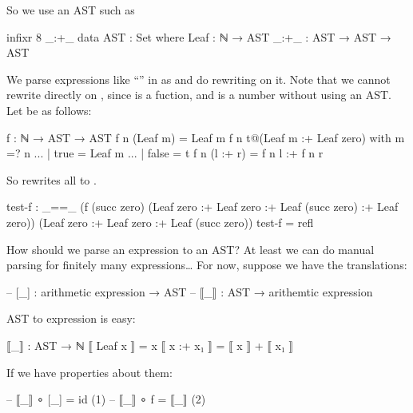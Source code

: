 \documentclass{article}
\begin{document}
So we use an AST such as

\begin{code}
infixr 8 _:+_
data AST : Set where
  Leaf : ℕ → AST
  _:+_ : AST → AST → AST
\end{code}
  
We parse expressions like ``'' in as  \AgdaOperator{\AgdaInductiveConstructor{:+}}  and do rewriting on it. Note that we cannot rewrite directly on  \AgdaOperator{\AgdaFunction{+}} , since \AgdaFunction{\AgdaUnderscore{}+\AgdaUnderscore{}} is a fuction, and  \AgdaOperator{\AgdaFunction{+}}  is a number without using an AST. Let  be as follows:

\begin{code}
f : ℕ → AST → AST
f n (Leaf m) = Leaf m
f n t@(Leaf m :+ Leaf zero) with m =? n
... | true = Leaf m
... | false = t
f n (l :+ r) = f n l :+ f n r
\end{code}

So   rewrites all   \AgdaOperator{\AgdaInductiveConstructor{:+}}   to  .

\begin{code}
test-f : _==_ (f (succ zero) (Leaf zero :+ Leaf zero :+ Leaf (succ zero) :+ Leaf zero))
              (Leaf zero :+ Leaf zero :+ Leaf (succ zero))
test-f = refl
\end{code}

How should we parse an expression to an AST? At least we can do manual parsing for finitely many expressions\ldots{} For now, suppose we have the translations:

\begin{code}
-- [_] : arithmetic expression → AST
-- ⟦_⟧ : AST → arithemtic expression
\end{code}

AST to expression is easy:

\begin{code}
⟦_⟧ : AST → ℕ
⟦ Leaf x ⟧ = x
⟦ x :+ x₁ ⟧ = ⟦ x ⟧ + ⟦ x₁ ⟧
\end{code}

If we have properties about them:

\begin{code}
-- ⟦_⟧ ∘ [_] = id     (1)
-- ⟦_⟧ ∘ f = ⟦_⟧      (2)
\end{code}
\end{document}
